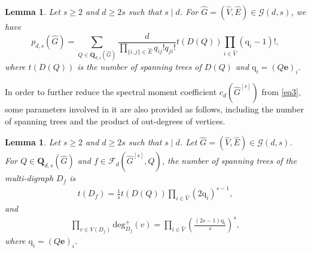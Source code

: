 \documentclass{article}
\newtheorem{lem}[thm]{Lemma}
\begin{document}
\begin{lem}\label{yinli6}
Let $s \geq 2$ and $d \geq 2s$ such that $s \mid d$.
For $\widehat{G}=(\widehat{V},\widehat{E}) \in \mathcal{G}(d,s)$,
we have
$$p_{d,s}(\widehat{G})
=\sum_{Q \in \mathbf{Q}_{d,s}(\widehat{G})}\frac{d}{\prod_{\{i,j\}\in\widehat{E}}q_{ij}!q_{ji}!}t(D(Q))\prod_{i\in\widehat{V}}(\mathrm{q}_{i}-1)!,$$
where $t(D(Q))$ is the number of spanning trees of $D(Q)$ and $\mathrm{q}_{i}=(Q\mathbf{e})_{i}$.
\end{lem}

In order to further reduce the spectral moment coefficient $c_{d}(\widehat{G}^{[s]})$ from \eqref{eq3},
some parameters involved in it are also provided as follows,
including the number of spanning trees and the product of out-degrees of vertices.

\begin{lem}\label{yinli7}
Let $s \geq 2$ and $d \geq 2s$ such that $s \mid d$.
Let $\widehat{G}=(\widehat{V},\widehat{E}) \in \mathcal{G}(d,s)$.
For $Q \in \mathbf{Q}_{d,s}(\widehat{G})$ and $f \in \mathcal{F}_{d}(\widehat{G}^{[s]},Q)$,
the number of spanning trees of the multi-digraph $D_f$ is
\begin{align*}
t(D_f)=\frac{1}{s}t(D(Q))\prod_{i\in\widehat{V}}\left(2\mathrm{q}_{i}\right)^{s-1},
\end{align*}
and
\begin{align*}
\prod_{v \in V(D_f)}\mathrm{deg}_{D_f}^{+}(v)=\prod_{i\in\widehat{V}}\left(\frac{(2s-1)\mathrm{q}_{i}}{s}\right)^{s},
\end{align*}
where $\mathrm{q}_{i}=(Q\mathbf{e})_{i}$.
\end{lem}
\end{document}
